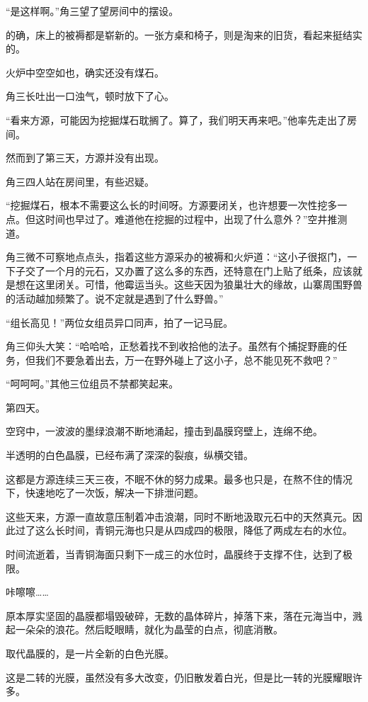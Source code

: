 \begin{this_body}
“是这样啊。”角三望了望房间中的摆设。

的确，床上的被褥都是崭新的。一张方桌和椅子，则是淘来的旧货，看起来挺结实的。

火炉中空空如也，确实还没有煤石。

角三长吐出一口浊气，顿时放下了心。

“看来方源，可能因为挖掘煤石耽搁了。算了，我们明天再来吧。”他率先走出了房间。

然而到了第三天，方源并没有出现。

角三四人站在房间里，有些迟疑。

“挖掘煤石，根本不需要这么长的时间呀。方源要闭关，也许想要一次性挖多一点。但这时间也早过了。难道他在挖掘的过程中，出现了什么意外？”空井推测道。

角三微不可察地点点头，指着这些方源采办的被褥和火炉道：“这小子很抠门，一下子交了一个月的元石，又办置了这么多的东西，还特意在门上贴了纸条，应该就是想在这里闭关。可惜，他霉运当头。这些天因为狼巢壮大的缘故，山寨周围野兽的活动越加频繁了。说不定就是遇到了什么野兽。”

“组长高见！”两位女组员异口同声，拍了一记马屁。

角三仰头大笑：“哈哈哈，正愁着找不到收拾他的法子。虽然有个捕捉野鹿的任务，但我们不要急着出去，万一在野外碰上了这小子，总不能见死不救吧？”

“呵呵呵。”其他三位组员不禁都笑起来。

第四天。

空窍中，一波波的墨绿浪潮不断地涌起，撞击到晶膜窍壁上，连绵不绝。

半透明的白色晶膜，已经布满了深深的裂痕，纵横交错。

这都是方源连续三天三夜，不眠不休的努力成果。最多也只是，在熬不住的情况下，快速地吃了一次饭，解决一下排泄问题。

这些天来，方源一直故意压制着冲击浪潮，同时不断地汲取元石中的天然真元。因此过了这么长时间，青铜元海也只是从四成四的极限，降低了两成左右的水位。

时间流逝着，当青铜海面只剩下一成三的水位时，晶膜终于支撑不住，达到了极限。

咔嚓嚓……

原本厚实坚固的晶膜都塌毁破碎，无数的晶体碎片，掉落下来，落在元海当中，溅起一朵朵的浪花。然后眨眼睛，就化为晶莹的白点，彻底消散。

取代晶膜的，是一片全新的白色光膜。

这是二转的光膜，虽然没有多大改变，仍旧散发着白光，但是比一转的光膜耀眼许多。


\end{this_body}
